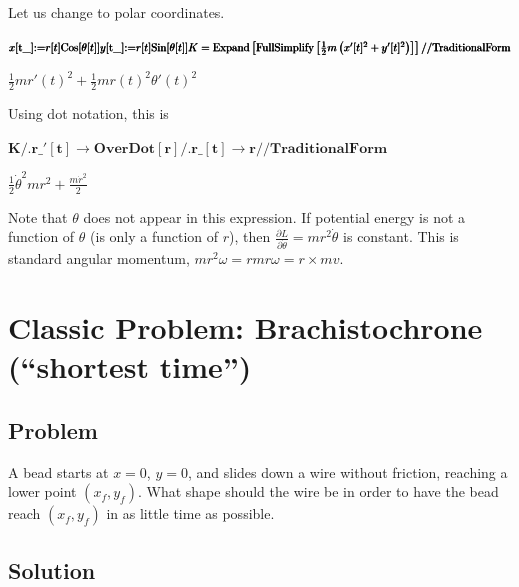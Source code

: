 \documentclass{article}
\begin{document}
Let us change to polar coordinates.

\begin{doublespace}
\noindent\(\pmb{x[\text{t$\_$}]\text{:=}r[t]\text{Cos}[\theta [t]]}\\
\pmb{y[\text{t$\_$}]\text{:=}r[t]\text{Sin}[\theta [t]]}\\
\pmb{K=\text{Expand}\left[\text{FullSimplify}\left[\frac{1}{2}m\left(x'[t]^2+y'[t]^2\right)\right]\right]\text{//}\text{TraditionalForm}}\)
\end{doublespace}

\begin{doublespace}
\noindent\(\frac{1}{2} m r'(t)^2+\frac{1}{2} m r(t)^2 \theta '(t)^2\)
\end{doublespace}

Using dot notation, this is

\begin{doublespace}
\noindent\(\pmb{K\text{/.}\text{r$\_$}'[t]\to \text{OverDot}[r]\text{/.}\text{r$\_$}[t]\to r\text{//}\text{TraditionalForm}}\)
\end{doublespace}

\begin{doublespace}
\noindent\(\frac{1}{2} \dot{\theta }^2 m r^2+\frac{m \dot{r}^2}{2}\)
\end{doublespace}

Note that \(\theta\) does not appear in this expression. { }If potential energy is not a function of \(\theta\) (is only a function of \(r\)), then
\(\frac{\partial L}{\partial \dot{\theta }}=m r^2 \dot{\theta }\) is constant. { }This is standard angular momentum, \(m r^2\omega = r m r \omega
=r\times m v\).

\section*{Classic Problem: Brachistochrone ({``}shortest time{''})}

\subsection*{Problem}

A bead starts at \(x=0\), \(y=0\), and slides down a wire without friction, reaching a lower point \(\left(x_f,y_f\right)\). { }What shape should
the wire be in order to have the bead reach \(\left(x_f,y_f\right)\) in as little time as possible.

\subsection*{Solution}
\end{document}
